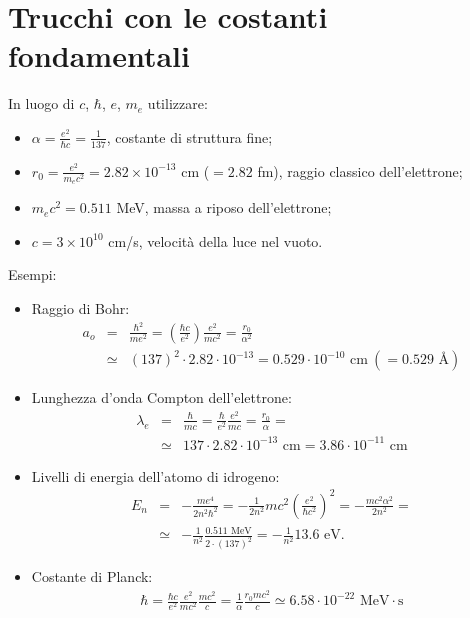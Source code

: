 \section{Trucchi con le costanti fondamentali}
In luogo di $c$, $\hbar$, $e$, $m_e$ utilizzare:
\begin{itemize}
\item $\displaystyle{\alpha =\frac{e^2}{\hbar c}}= \frac{1}{137}$, costante di struttura fine;
\item $\displaystyle{r_0 =\frac{e^2}{m_e c^2}=2.82 \times 10^{-13}}$ cm ($=2.82$ fm), raggio classico dell'elettrone;
\item $\displaystyle{m_ec^2=0.511}$ MeV, massa a riposo dell'elettrone;
\item $\displaystyle{c=3\times 10^{10}}$ cm/s, velocità della luce nel vuoto.
\end{itemize}
Esempi:
\begin{itemize}
\item[ ]Raggio di Bohr:
\begin{eqnarray}
a_o &=&\frac{\hbar ^2}{me^2}=\left( \frac{\hbar c}{e^2}\right)\frac{e ^2}{mc^2}=\frac{r_0}{\alpha ^2} \nonumber \\
&\simeq &(137)^2\cdot 2.82 \cdot 10^{-13}=0.529\cdot10^{-10} \textrm{ cm}\ (=0.529 \textrm{ Å})\nonumber
\end{eqnarray}
\item[ ]Lunghezza d'onda Compton dell'elettrone:
\begin{eqnarray}
\lambda _e &=&\frac{\hbar}{mc}=\frac{\hbar}{e^2}\frac{e^2}{mc}= \frac{r_0}{\alpha}= \nonumber \\
&\simeq & 137\cdot 2.82\cdot 10^{-13} \textrm{ cm}= 3.86 \cdot 10^{-11} \textrm{ cm} \nonumber
\end{eqnarray}
\item[ ]Livelli di energia dell'atomo di idrogeno:
\begin{eqnarray}
E_n &=& -\frac{me^4}{2n^2\hbar^2}=-\frac{1}{2n^2}mc^2 \left(\frac{e^2}{\hbar c^2}\right)^2= -\frac{mc^2 \alpha ^2}{2n^2}= \nonumber \\
&\simeq & -\frac{1}{n^2}\frac{0.511 \textrm{ MeV}}{2\cdot (137)^2}=-\frac{1}{n^2}13.6 \textrm{ eV}. \nonumber
\end{eqnarray}
\item[ ]Costante di Planck:
\begin{eqnarray}
\hbar =\frac{\hbar c}{e^2}\frac{e^2}{mc^2}\frac{mc^2}{c}=\frac{1}{\alpha}\frac{r_0 mc^2}{c}\simeq 6.58\cdot10^{-22} \textrm{ MeV}\cdot \textrm{s} \nonumber 
\end{eqnarray}
\end{itemize}

